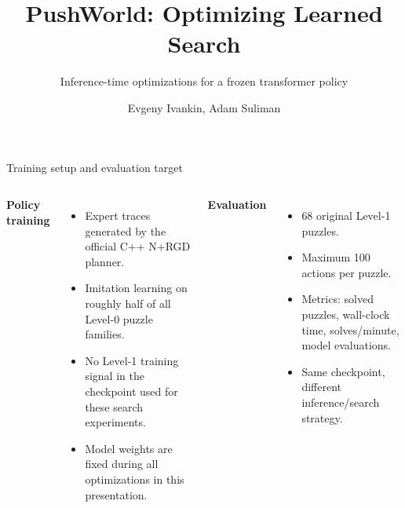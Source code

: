 \documentclass[aspectratio=169]{beamer}
\title{PushWorld: Optimizing Learned Search}
\subtitle{Inference-time optimizations for a frozen transformer policy}
\author{Evgeny Ivankin, Adam Suliman}
\date{}
\begin{document}
\begin{frame}
  \titlepage
\end{frame}

\begin{frame}{Training setup and evaluation target}
  \small
  \begin{columns}[T]
    \textbf{Policy training}
    \begin{itemize}
      \item Expert traces generated by the official C++ N+RGD planner.
      \item Imitation learning on roughly half of all Level-0 puzzle families.
      \item No Level-1 training signal in the checkpoint used for these search experiments.
      \item Model weights are fixed during all optimizations in this presentation.
    \end{itemize}

    \textbf{Evaluation}
    \begin{itemize}
      \item 68 original Level-1 puzzles.
      \item Maximum 100 actions per puzzle.
      \item Metrics: solved puzzles, wall-clock time, solves/minute, model evaluations.
      \item Same checkpoint, different inference/search strategy.
    \end{itemize}
  \end{columns}
\end{frame}
\end{document}

